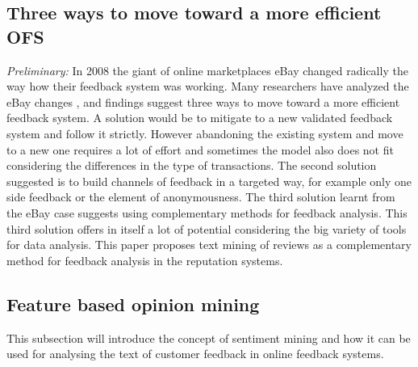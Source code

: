 \subsection{Three ways to move toward a more efficient OFS}
\textit{Preliminary:} In 2008 the giant of online marketplaces eBay changed radically the way how their feedback system was working. Many researchers have analyzed the eBay changes \cite{fradkin2016bias,resnick2006value,bolton2013engineering,dini2009buying,dellarocas2008sound}, and findings suggest three ways to move toward a more efficient feedback system. A solution would be to mitigate to a new validated feedback system and follow it strictly. However abandoning the existing system and move to a new one requires a lot of effort and sometimes the model also does not fit considering the differences in the type of transactions. The second solution suggested is to build channels of feedback in a targeted way, for example only one side feedback or the element of anonymousness. The third solution learnt from the eBay case suggests using complementary methods for feedback analysis. This third solution offers in itself a lot of potential considering the big variety of tools for data analysis. This paper proposes text mining of reviews as a complementary method for feedback analysis in the reputation systems. 

\subsection{Feature based opinion mining}
This subsection will introduce the concept of sentiment mining and how it can be used for analysing the text of customer feedback in online feedback systems.

